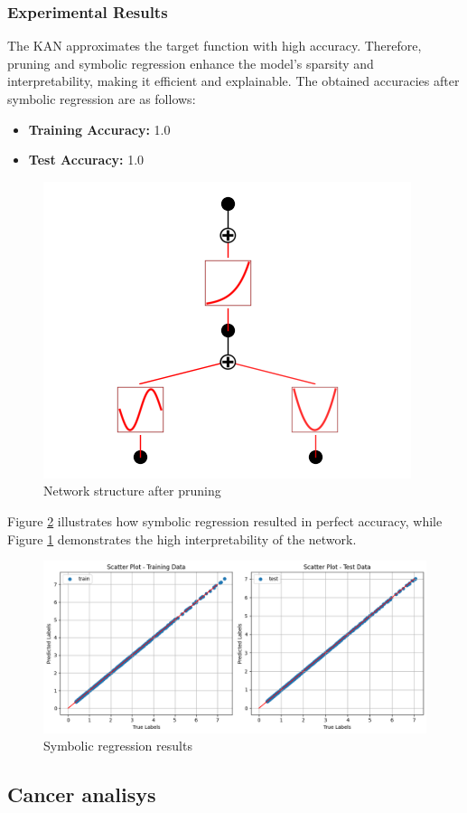 \subsubsection{Experimental Results}
The KAN approximates the target function with high accuracy. Therefore, pruning and symbolic regression enhance the model's sparsity and interpretability, making it efficient and explainable.
The obtained accuracies after symbolic regression are as follows:
\begin{itemize}
    \item \textbf{Training Accuracy:} 1.0
    \item \textbf{Test Accuracy:} 1.0
\end{itemize}

\begin{figure}[H]
    \centering
    \includegraphics[width=0.35\linewidth]{LATEX//Images/symbolic.png}
    \caption{Network structure after pruning}
    \label{fig:sy}
\end{figure}

Figure \ref{fig:reg} illustrates how symbolic regression resulted in perfect accuracy, while Figure \ref{fig:sy} demonstrates the high interpretability of the network.

\begin{figure}[H]
    \centering
    \includegraphics[width=0.75\linewidth]{LATEX//Images/regression.png}
    \caption{Symbolic regression results}
    \label{fig:reg}
\end{figure}




\subsection{Cancer analisys}

